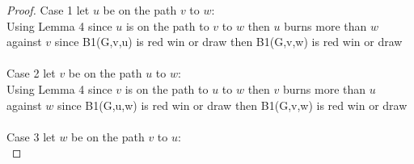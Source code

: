 \documentclass{article}
\begin{document}
\begin{proof}

Case 1 let \(u\) be on the path \(v\) to \(w\): 
\\

Using Lemma 4 since \(u\) is on the path to \(v\) to \(w\) then \(u\) burns more than \(w\) against \(v\) since B1(G,v,u) is red win or draw then B1(G,v,w) is red win or draw
\\ \\
Case 2 let \(v\) be on the path \(u\) to \(w\):\\

Using Lemma 4 since \(v\) is on the path to \(u\) to \(w\) then \(v\) burns more than \(u\) against \(w\) since B1(G,u,w) is red win or draw then B1(G,v,w) is red win or draw
\\ \\
Case 3 let \(w\) be on the path \(v\) to \(u\):\\


\end{proof}
\end{document}
